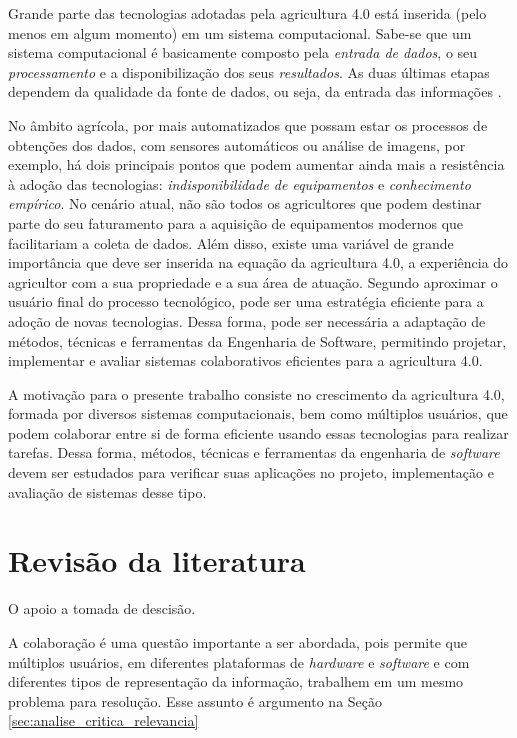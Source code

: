 \documentclass[12pt]{article}
\begin{document}
Grande parte das tecnologias adotadas pela agricultura 4.0 está inserida (pelo menos em algum momento) em um sistema computacional. Sabe-se que um sistema computacional é basicamente composto pela \textit{entrada de dados}, o seu \textit{processamento} e a disponibilização dos seus \textit{resultados}. As duas últimas etapas dependem da qualidade da fonte de dados, ou seja, da entrada das informações \cite{Torres:2013}.

No âmbito agrícola, por mais automatizados que possam estar os processos de obtenções dos dados, com sensores automáticos ou análise de imagens, por exemplo, há dois principais pontos que podem aumentar ainda mais a resistência à adoção das tecnologias: \textit{indisponibilidade de equipamentos} e \textit{conhecimento empírico}. No cenário atual, não são todos os agricultores que podem destinar parte do seu faturamento para a aquisição de equipamentos modernos que facilitariam a coleta de dados. Além disso, existe uma variável de grande importância que deve ser inserida na equação da agricultura 4.0, a experiência do agricultor com a sua propriedade e a sua área de atuação. Segundo  aproximar o usuário final do processo tecnológico, pode ser uma estratégia eficiente para a adoção de novas tecnologias. Dessa forma, pode ser necessária a adaptação de métodos, técnicas e ferramentas da Engenharia de Software, permitindo projetar, implementar e avaliar sistemas colaborativos eficientes para a agricultura 4.0.

A motivação para o presente trabalho consiste no crescimento da agricultura 4.0, formada por diversos sistemas computacionais, bem como múltiplos usuários, que podem colaborar entre si de forma eficiente usando essas tecnologias para realizar tarefas. Dessa forma, métodos, técnicas e ferramentas da engenharia de \textit{software} devem ser estudados para verificar suas aplicações no projeto, implementação e avaliação de sistemas desse tipo.

\section{Revisão da literatura}
\label{sec:revisao_literatura}

O apoio a tomada de descisão.

A colaboração é uma questão importante a ser abordada, pois permite que múltiplos usuários, em diferentes plataformas de \textit{hardware} e \textit{software} e com diferentes tipos de representação da informação, trabalhem em um mesmo problema para resolução. Esse assunto é argumento na Seção \ref{sec:analise_critica_relevancia}
\end{document}
